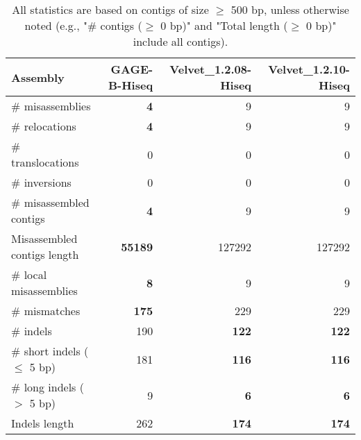 \documentclass[12pt,a4paper]{article}
\begin{document}
\begin{table}[ht]
\begin{center}
\caption{All statistics are based on contigs of size $\geq$ 500 bp, unless otherwise noted (e.g., "\# contigs ($\geq$ 0 bp)" and "Total length ($\geq$ 0 bp)" include all contigs).}
\begin{tabular}{|l*{3}{|r}|}
\hline
Assembly & GAGE-B-Hiseq & Velvet\_1.2.08-Hiseq & Velvet\_1.2.10-Hiseq \\ \hline
\# misassemblies & {\bf 4} & 9 & 9 \\ \hline
\hspace{5mm}\# relocations & {\bf 4} & 9 & 9 \\ \hline
\hspace{5mm}\# translocations & 0 & 0 & 0 \\ \hline
\hspace{5mm}\# inversions & 0 & 0 & 0 \\ \hline
\# misassembled contigs & {\bf 4} & 9 & 9 \\ \hline
Misassembled contigs length & {\bf 55189} & 127292 & 127292 \\ \hline
\# local misassemblies & {\bf 8} & 9 & 9 \\ \hline
\# mismatches & {\bf 175} & 229 & 229 \\ \hline
\# indels & 190 & {\bf 122} & {\bf 122} \\ \hline
\hspace{5mm}\# short indels ($\leq$ 5 bp) & 181 & {\bf 116} & {\bf 116} \\ \hline
\hspace{5mm}\# long indels ($>$ 5 bp) & 9 & {\bf 6} & {\bf 6} \\ \hline
Indels length & 262 & {\bf 174} & {\bf 174} \\ \hline
\end{tabular}
\end{center}
\end{table}
\end{document}
